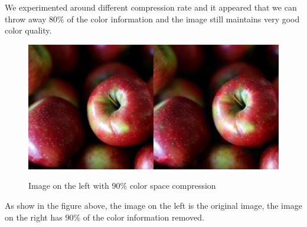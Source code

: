 \documentclass[12pt]{article}
\begin{document}
We experimented around different compression rate and it appeared that we can throw away $80\%$ of the color information and the image still maintains very good color quality. 


\begin{figure}[H]
 \centering
  \includegraphics[width=5.0in]{resource/colorcompress.png}
 \label{yuvimage}
 \caption{Image on the left with $90\%$ color space compression}
\end{figure}

As show in the figure above, the image on the left is the original image, the image on the right has $90\%$ of the color information removed.
\end{document}
